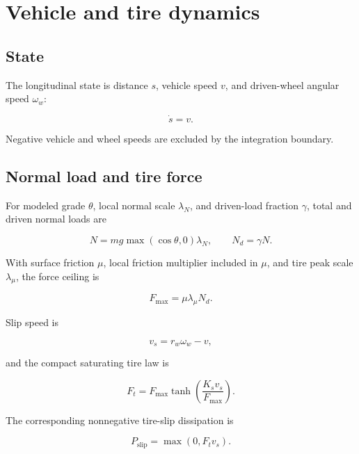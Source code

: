 \documentclass[11pt,oneside]{report}
\begin{document}
\chapter{Vehicle and tire dynamics}\label{ch:vehicle}

\section{State}

The longitudinal state is distance $s$, vehicle speed $v$, and driven-wheel angular
speed $\omega_w$:

\begin{equation}
\dot{s}=v.
\end{equation}

Negative vehicle and wheel speeds are excluded by the integration boundary.

\section{Normal load and tire force}

For modeled grade $\theta$, local normal scale $\lambda_N$, and driven-load fraction
$\gamma$, total and driven normal loads are

\begin{equation}
N=mg\max(\cos\theta,0)\lambda_N,\qquad N_d=\gamma N.
\end{equation}

With surface friction $\mu$, local friction multiplier included in $\mu$, and tire
peak scale $\lambda_\mu$, the force ceiling is

\begin{equation}
F_{\max}=\mu\lambda_\mu N_d.
\end{equation}

Slip speed is

\begin{equation}
v_s=r_w\omega_w-v,
\end{equation}

and the compact saturating tire law is

\begin{equation}
F_t=F_{\max}\tanh\left(\frac{K_s v_s}{F_{\max}}\right).
\label{eq:tire}
\end{equation}

The corresponding nonnegative tire-slip dissipation is

\begin{equation}
P_{\mathrm{slip}}=\max(0,F_t v_s).
\end{equation}
\end{document}
